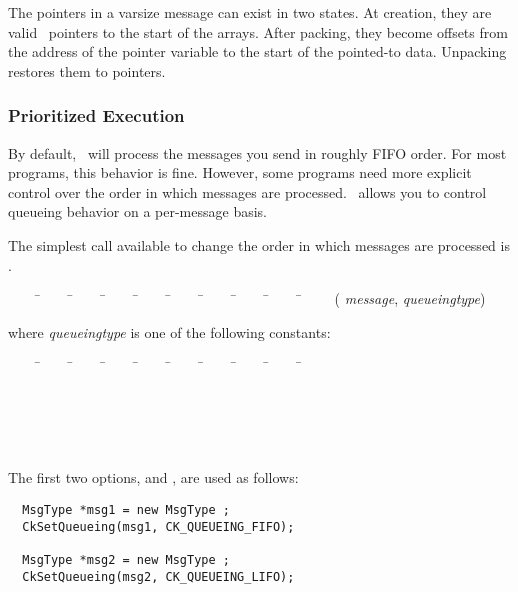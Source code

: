 The pointers in a varsize message can exist in two states.  
At creation, they are valid \CC\ pointers to the start of the arrays.  
After packing, they become offsets from the address of the pointer variable to 
the start of the pointed-to data.  Unpacking restores them to pointers. 


\subsubsection{Prioritized Execution}
\label{prioritized message passing}

By default, \charmpp\ will process the messages you send in roughly
FIFO order.  For most programs, this
behavior is fine.  However, some programs need more explicit control
over the order in which messages are processed.  \charmpp\ allows you
to control queueing behavior on a per-message basis.

The simplest call available to change the order in which messages
are processed is .

\begin{tabbing}
~~~~ \=~~~~ \=~~~~ \=~~~~ \=~~~~ \=~~~~ \=~~~~ \=~~~~ \=~~~~ \=~~~~ \kill
\> ( {\it message},  {\it
queueingtype}) \\
\end{tabbing}

where {\it queueingtype} is one of the following
constants:

\begin{tabbing}
~~~~ \=~~~~ \=~~~~ \=~~~~ \=~~~~ \=~~~~ \=~~~~ \=~~~~ \=~~~~ \=~~~~ \kill
\> \\
\> \\
\> \\
\> \\
\> \\
\> 
\end{tabbing}

The first two options,   and
, are used as follows: 

\begin{verbatim}
  MsgType *msg1 = new MsgType ;
  CkSetQueueing(msg1, CK_QUEUEING_FIFO);

  MsgType *msg2 = new MsgType ;
  CkSetQueueing(msg2, CK_QUEUEING_LIFO);
\end{verbatim}

